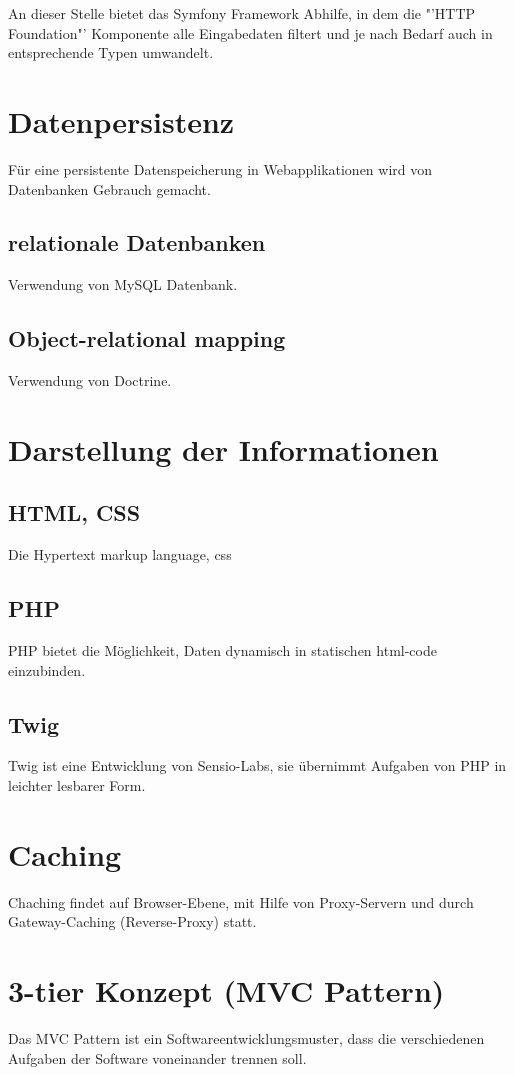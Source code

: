 \documentclass[12pt]{report}
\begin{document}
An dieser Stelle bietet das Symfony Framework Abhilfe, in dem die "'HTTP Foundation"' Komponente alle Eingabedaten filtert und je nach Bedarf auch in entsprechende Typen umwandelt.\cite{sf2:HTTPFoundation}

\section{Datenpersistenz}
Für eine persistente Datenspeicherung in Webapplikationen wird von Datenbanken Gebrauch gemacht.
\subsection{relationale Datenbanken}
Verwendung von MySQL Datenbank.
\subsection{Object-relational mapping}
Verwendung von Doctrine.

\section{Darstellung der Informationen}
\subsection{HTML, CSS}
Die Hypertext markup language, css
\subsection{PHP}
PHP bietet die Möglichkeit, Daten dynamisch in statischen html-code einzubinden.
\subsection{Twig}
Twig ist eine Entwicklung von Sensio-Labs, sie übernimmt Aufgaben von PHP in leichter lesbarer Form.

\section{Caching}
Chaching findet auf Browser-Ebene, mit Hilfe von Proxy-Servern und durch Gateway-Caching (Reverse-Proxy) statt.

\section{3-tier Konzept (MVC Pattern)}
Das MVC Pattern ist ein Softwareentwicklungsmuster, dass die verschiedenen Aufgaben der Software voneinander trennen soll.
\end{document}
